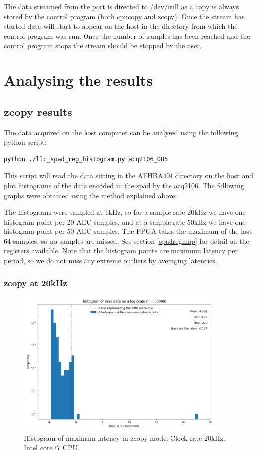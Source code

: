 \documentclass{article}
\begin{document}
The data streamed from the port is directed to /dev/null as a copy is always stored by the control program (both cpucopy and zcopy).
Once the stream has started data will start to appear on the host in the directory from which the control program was run.
Once the number of samples has been reached and the control program stops the stream should be stopped by the user.

\section{Analysing the results} \label{analysis}
\subsection{zcopy results}
The data acquired on the host computer can be analysed using the following python script:

\begin{verbatim}
python ./llc_spad_reg_histogram.py acq2106_085
\end{verbatim}

This script will read the data sitting in the AFHBA404 directory on the host and plot histograms of the data encoded in the spad by the acq2106.
The following graphs were obtained using the method explained above:

The histograms were sampled at 1kHz, so for a sample rate 20kHz we have one histogram point per 20 ADC samples, and at a sample rate 50kHz we have one histogram point per 50 ADC samples.
The FPGA takes the maximum of the last 64 samples, so no samples are missed. See section \ref{spadregmap} for detail on the registers available. Note that the histogram points are maximum latency per period, so we do not miss any extreme outliers by averaging latencies.

\subsubsection{zcopy at 20kHz}

\begin{figure} [htb!]
	\centering
	\includegraphics[width=4.0in]{images/better_images/20kHz_final_small.png}
	\caption{Histogram of maximum latency in zcopy mode. Clock rate 20kHz. Intel core i7 CPU.}
	\label{zcopy20hist}
\end{figure}
\end{document}
